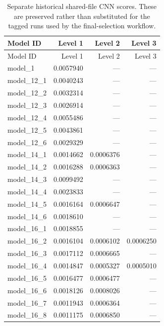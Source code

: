 \begingroup\footnotesize\setlength{\tabcolsep}{3pt}\renewcommand{\arraystretch}{1.05}
\begin{longtable}{lrrr}
\caption{Separate historical shared-file CNN scores. These are preserved rather than substituted for the tagged runs used by the final-selection workflow.}\label{tab:cnn-shared}\\
\toprule
Model ID & Level 1 & Level 2 & Level 3 \\
\midrule
\endfirsthead
\toprule
Model ID & Level 1 & Level 2 & Level 3 \\
\midrule\endhead
\bottomrule\endfoot
model\_1 & 0.0057940 & --- & --- \\
model\_12\_1 & 0.0040243 & --- & --- \\
model\_12\_2 & 0.0032314 & --- & --- \\
model\_12\_3 & 0.0026914 & --- & --- \\
model\_12\_4 & 0.0055486 & --- & --- \\
model\_12\_5 & 0.0043861 & --- & --- \\
model\_12\_6 & 0.0029329 & --- & --- \\
model\_14\_1 & 0.0014662 & 0.0006376 & --- \\
model\_14\_2 & 0.0016288 & 0.0006363 & --- \\
model\_14\_3 & 0.0099492 & --- & --- \\
model\_14\_4 & 0.0023833 & --- & --- \\
model\_14\_5 & 0.0016164 & 0.0006647 & --- \\
model\_14\_6 & 0.0018610 & --- & --- \\
model\_16\_1 & 0.0018855 & --- & --- \\
model\_16\_2 & 0.0016104 & 0.0006102 & 0.0006250 \\
model\_16\_3 & 0.0017112 & 0.0006665 & --- \\
model\_16\_4 & 0.0014847 & 0.0005327 & 0.0005010 \\
model\_16\_5 & 0.0016477 & 0.0006477 & --- \\
model\_16\_6 & 0.0018126 & 0.0008026 & --- \\
model\_16\_7 & 0.0011943 & 0.0006364 & --- \\
model\_16\_8 & 0.0011175 & 0.0006850 & --- \\
\end{longtable}\endgroup
